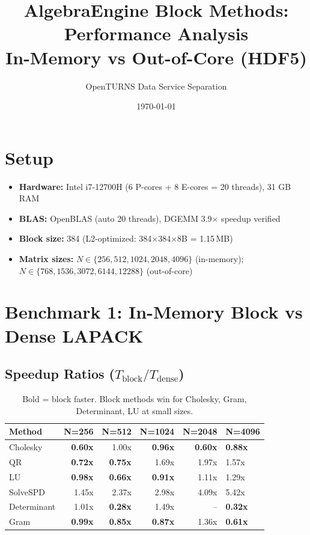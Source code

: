 \documentclass[11pt,a4paper]{article}
\title{AlgebraEngine Block Methods: Performance Analysis\\
\large In-Memory vs Out-of-Core (HDF5)}
\author{OpenTURNS Data Service Separation}
\date{\today}
\begin{document}
\maketitle

\section{Setup}

\begin{itemize}
\item \textbf{Hardware:} Intel i7-12700H (6 P-cores + 8 E-cores = 20 threads), 31 GB RAM
\item \textbf{BLAS:} OpenBLAS (auto 20 threads), DGEMM 3.9$\times$ speedup verified
\item \textbf{Block size:} 384 (L2-optimized: 384$\times$384$\times$8B = 1.15\,MB)
\item \textbf{Matrix sizes:} $N \in \{256, 512, 1024, 2048, 4096\}$ (in-memory); $N \in \{768, 1536, 3072, 6144, 12288\}$ (out-of-core)
\end{itemize}

\section{Benchmark 1: In-Memory Block vs Dense LAPACK}

\subsection{Speedup Ratios ($T_{\text{block}} / T_{\text{dense}}$)}

\begin{table}[h]
\centering
\small
\begin{tabular}{lrrrr}
\toprule
\textbf{Method} & \textbf{N=256} & \textbf{N=512} & \textbf{N=1024} & \textbf{N=2048} & \textbf{N=4096} \\
\midrule
Cholesky     & \textbf{0.60x} & 1.00x & \textbf{0.96x} & \textbf{0.60x} & \textbf{0.88x} \\
QR           & \textbf{0.72x} & \textbf{0.75x} & 1.69x & 1.97x & 1.57x \\
LU           & \textbf{0.98x} & \textbf{0.66x} & \textbf{0.91x} & 1.11x & 1.29x \\
SolveSPD     & 1.45x & 2.37x & 2.98x & 4.09x & 5.42x \\
Determinant  & 1.01x & \textbf{0.28x} & 1.49x & -- & \textbf{0.32x} \\
Gram         & \textbf{0.99x} & \textbf{0.85x} & \textbf{0.87x} & 1.36x & \textbf{0.61x} \\
\bottomrule
\end{tabular}
\caption{Bold = block faster. Block methods win for Cholesky, Gram, Determinant, LU at small sizes.}
\end{table}
\end{document}
